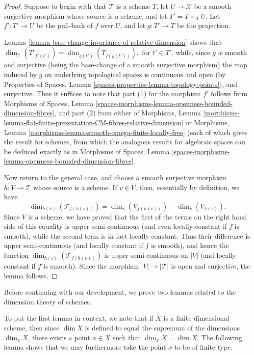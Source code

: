 \begin{proof}
Suppose to begin with that $\mathcal{T}$ is a scheme $T$,
let $U \to \mathcal{X}$ be a smooth surjective morphism whose source
is a scheme, and let $T' = T \times_{\mathcal{X}} U$.
Let $f': T' \to U$ be the pull-back of $f$ over $U$,
and let $g: T' \to T$ be the projection.

\medskip\noindent
Lemma \ref{lemma-base-change-invariance-of-relative-dimension}
shows that $\dim_{t'}(T'_{f'(t')}) = \dim_{g(t')}(T_{f(g(t'))}),$
for $t' \in T'$, while,
since $g$ is smooth and surjective (being the base-change
of a smooth surjective morphism) the map induced by $g$ on underlying
topological spaces is continuous and open
(by
Properties of Spaces, Lemma \ref{spaces-properties-lemma-topology-points}), and
surjective. Thus it suffices to note that part (1) for the morphism $f'$
follows from
Morphisms of Spaces, Lemma
\ref{spaces-morphisms-lemma-openness-bounded-dimension-fibres}, and part (2)
from either of Morphisms, Lemma
\ref{morphisms-lemma-flat-finite-presentation-CM-fibres-relative-dimension}
or
Morphisms, Lemma \ref{morphisms-lemma-smooth-omega-finite-locally-free}
(each of which gives the result for schemes, from which
the analogous results for algebraic spaces can
be deduced exactly as in
Morphisms of Spaces, Lemma
\ref{spaces-morphisms-lemma-openness-bounded-dimension-fibres}.

\medskip\noindent
Now return to the general case,
and choose a smooth surjective morphism
$h:V \to \mathcal{T}$ whose source is a scheme.
If $v \in V$, then, essentially by definition,
we have
$$
\dim_{h(v)}(\mathcal{T}_{f(h(v))}) =
\dim_{v}(V_{f(h(v))}) - \dim_{v}(V_{h(v)}).
$$
Since $V$ is a scheme, we have proved that the first
of the terms on the right hand side of this equality
is upper semi-continuous (and even locally
constant if $f$ is smooth), while the second term is
in fact locally constant.
Thus their difference is upper semi-continuous
(and locally constant if $f$ is smooth),
and hence the function
$\dim_{h(v)}(\mathcal{T}_{f(h(v))})$
is upper semi-continuous on $|V|$ (and locally
constant if $f$ is smooth).
Since the morphism $|V| \to |\mathcal{T}|$ is open and surjective,
the lemma follows.
\end{proof}

\noindent
Before continuing with our development,
we prove two lemmas related to the dimension theory of schemes.

\medskip\noindent
To put the first lemma in context,
we note that if $X$ is a finite dimensional scheme, then since $\dim X$
is defined to equal the supremum of the dimensions $\dim_x X$,
there exists a point $x \in X$ such that $\dim_x X = \dim X$.
The following lemma shows that we may furthermore take the point
$x$ to be of finite type.


